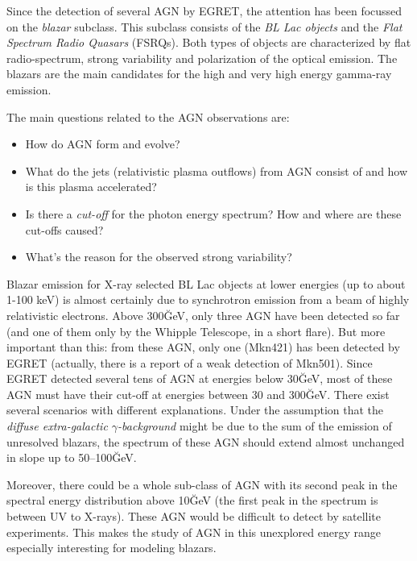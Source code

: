 
Since the detection  of several AGN  by EGRET, the  attention has been
focussed on the \emph{blazar} subclass. This  subclass consists of the
\emph{BL Lac  objects} and   the \emph{Flat  Spectrum  Radio  Quasars}
(FSRQs).   Both   types   of  objects     are  characterized  by  flat
radio-spectrum,  strong variability  and  polarization of  the optical
emission.  The blazars are  the main candidates for  the high and very
high energy gamma-ray emission.

The main questions related to the AGN observations are:
%
\begin{itemize}
\item How do AGN form and evolve?
\item What do the jets (relativistic plasma outflows) from AGN consist
  of and how is this plasma accelerated?
\item Is there  a \emph{cut-off} for the  photon  energy spectrum? How
  and where are these cut-offs caused?
\item What's the reason for the observed strong variability?
\end{itemize}

Blazar emission for  X-ray selected BL  Lac objects at lower  energies
(up to   about 1-100  keV)  is  almost certainly  due  to  synchrotron
emission  from a  beam    of  highly  relativistic  electrons.   Above
300\u{GeV}, only three AGN have been detected so  far (and one of them
only by the Whipple  Telescope, in a short  flare). But more important
than this:  from  these AGN, only  one (Mkn421)  has  been detected by
EGRET  (actually, there is  a report of a  weak  detection of Mkn501). 
Since EGRET detected several tens  of AGN at energies below 30\u{GeV},
most of  these AGN must have their  cut-off at energies between 30 and
300\u{GeV}. There exist several scenarios with different explanations.
Under    the   assumption  that    the  \emph{diffuse   extra-galactic
  $\gamma$-background} might be  due to  the  sum of the emission   of
unresolved   blazars, the spectrum of  these  AGN should extend almost
unchanged in slope up to 50--100\u{GeV}.

Moreover, there could be a whole sub-class of AGN with its second peak
in the spectral energy distribution above 10\u{GeV} (the first peak in
the spectrum is between UV to X-rays). These AGN would be difficult to
detect by satellite experiments. This  makes the study  of AGN in this
unexplored energy range especially interesting for modeling blazars.

